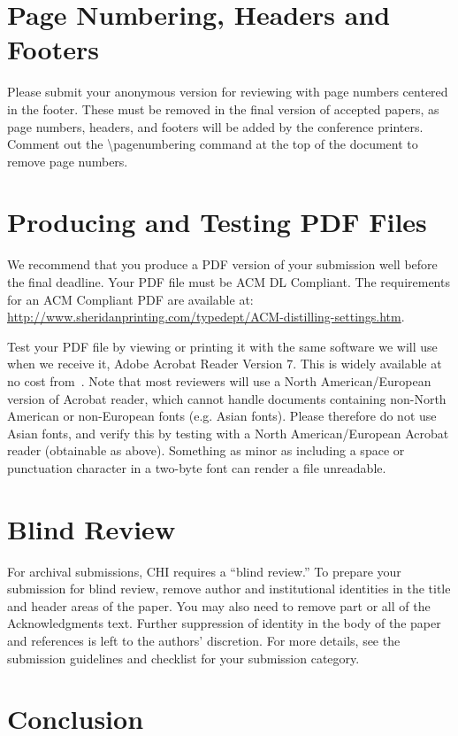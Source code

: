 \documentclass{sigchi}
\begin{document}
\section{Page Numbering, Headers and Footers}

Please submit your anonymous version for reviewing with page numbers
centered in the footer.  These must be removed in the final version of
accepted papers, as page numbers, headers, and footers will be added
by the conference printers.  Comment out the {\textbackslash}pagenumbering
command at the top of the document to remove page numbers.

\section{Producing and Testing PDF Files}

We recommend that you produce a PDF version of your submission well
before the final deadline.  Your PDF file must be ACM DL
Compliant. The requirements for an ACM Compliant PDF are available at:
{\url{http://www.sheridanprinting.com/typedept/ACM-distilling-settings.htm}}.

Test your PDF file by viewing or printing it with the same software we
will use when we receive it, Adobe Acrobat Reader Version 7. This is
widely available at no cost from~\cite{acrobat}.  Note that most
reviewers will use a North American/European version of Acrobat
reader, which cannot handle documents containing non-North American or
non-European fonts (e.g. Asian fonts).  Please therefore do not use
Asian fonts, and verify this by testing with a North American/European
Acrobat reader (obtainable as above). Something as minor as including
a space or punctuation character in a two-byte font can render a file
unreadable.

\section{Blind Review}

For archival submissions, CHI requires a ``blind review.'' To prepare
your submission for blind review, remove author and institutional
identities in the title and header areas of the paper. You may also
need to remove part or all of the Acknowledgments text.  Further
suppression of identity in the body of the paper and references is
left to the authors' discretion. For more details, see the submission
guidelines and checklist for your submission category.

\section{Conclusion}
\end{document}
